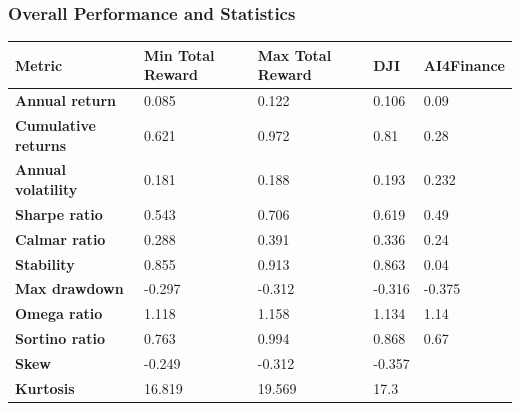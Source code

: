 \documentclass[../xlapes02]{subfiles}
\begin{document}
    \subsubsection{Overall Performance and Statistics}
    \begin{table}[!ht]
        \centering
        \begin{tabular}{|l|l|l|l|l|}
            \hline
            \textbf{Metric}              & \textbf{Min Total Reward} & \textbf{Max Total Reward} & \textbf{DJI} & \textbf{AI4Finance} \\ \hline
            \textbf{Annual return}       & 0.085                     & 0.122                     & 0.106        & 0.09                \\ \hline
            \textbf{Cumulative returns}  & 0.621                     & 0.972                     & 0.81         & 0.28                \\ \hline
            \textbf{Annual volatility}   & 0.181                     & 0.188                     & 0.193        & 0.232               \\ \hline
            \textbf{Sharpe ratio}        & 0.543                     & 0.706                     & 0.619        & 0.49                \\ \hline
            \textbf{Calmar ratio}        & 0.288                     & 0.391                     & 0.336        & 0.24                \\ \hline
            \textbf{Stability}           & 0.855                     & 0.913                     & 0.863        & 0.04                \\ \hline
            \textbf{Max drawdown}        & -0.297                    & -0.312                    & -0.316       & -0.375              \\ \hline
            \textbf{Omega ratio}         & 1.118                     & 1.158                     & 1.134        & 1.14                \\ \hline
            \textbf{Sortino ratio}       & 0.763                     & 0.994                     & 0.868        & 0.67                \\ \hline
            \textbf{Skew}                & -0.249                    & -0.312                    & -0.357       & ~                   \\ \hline
            \textbf{Kurtosis}            & 16.819                    & 19.569                    & 17.3         & ~                   \\ \hline

\end{tabular}
\end{table}
\end{document}
